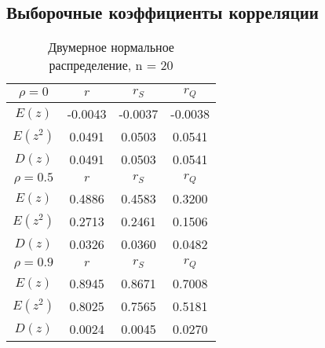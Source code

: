 \subsection{Выборочные коэффициенты корреляции}
	\begin{table}[H]
		\centering
		\begin{tabular}{| c | c | c | c |}

		\hline
		 ${\rho} = 0$   & $r$     & $r_{S}$ & $r_{Q}$ \\
		\hline
		 $E(z)$         & -0.0043 & -0.0037 & -0.0038 \\
		 $E(z^{2})$     & 0.0491  & 0.0503  & 0.0541  \\
		 $D(z)$         & 0.0491  & 0.0503  & 0.0541  \\
		\hline
		 ${\rho} = 0.5$ & $r$     & $r_{S}$ & $r_{Q}$ \\
		\hline
		 $E(z)$         & 0.4886  & 0.4583  & 0.3200  \\
		 $E(z^{2})$     & 0.2713  & 0.2461  & 0.1506  \\
		 $D(z)$         & 0.0326  & 0.0360  & 0.0482  \\
		\hline
		 ${\rho} = 0.9$ & $r$     & $r_{S}$ & $r_{Q}$ \\
		\hline
		 $E(z)$         & 0.8945  & 0.8671  & 0.7008  \\
		 $E(z^{2})$     & 0.8025  & 0.7565  & 0.5181  \\
		 $D(z)$         & 0.0024  & 0.0045  & 0.0270  \\
		\hline

		\end{tabular}{}
		\caption{Двумерное нормальное распределение, n = 20}
		\label{tab:n20}
	\end{table}


